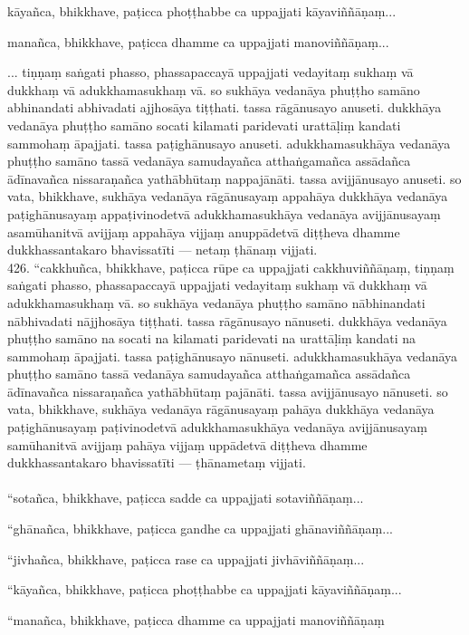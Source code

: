 \documentclass[11pt]{article}
\begin{document}
kāyañca, bhikkhave, paṭicca phoṭṭhabbe ca uppajjati kāyaviññāṇaṃ...\

manañca, bhikkhave, paṭicca dhamme ca uppajjati manoviññāṇaṃ...\

... tiṇṇaṃ saṅgati phasso, phassapaccayā uppajjati vedayitaṃ sukhaṃ vā dukkhaṃ vā adukkhamasukhaṃ vā. so sukhāya vedanāya phuṭṭho samāno abhinandati abhivadati ajjhosāya tiṭṭhati. tassa rāgānusayo anuseti. dukkhāya vedanāya phuṭṭho samāno socati kilamati paridevati urattāḷiṃ kandati sammohaṃ āpajjati. tassa paṭighānusayo anuseti. adukkhamasukhāya vedanāya phuṭṭho samāno tassā vedanāya samudayañca atthaṅgamañca assādañca ādīnavañca nissaraṇañca yathābhūtaṃ nappajānāti. tassa avijjānusayo anuseti. so vata, bhikkhave, sukhāya vedanāya rāgānusayaṃ appahāya dukkhāya vedanāya paṭighānusayaṃ appaṭivinodetvā adukkhamasukhāya vedanāya avijjānusayaṃ asamūhanitvā avijjaṃ appahāya vijjaṃ anuppādetvā diṭṭheva dhamme dukkhassantakaro bhavissatīti — netaṃ ṭhānaṃ vijjati.\\

426. “cakkhuñca, bhikkhave, paṭicca rūpe ca uppajjati cakkhuviññāṇaṃ, tiṇṇaṃ saṅgati phasso, phassapaccayā uppajjati vedayitaṃ sukhaṃ vā dukkhaṃ vā adukkhamasukhaṃ vā. so sukhāya vedanāya phuṭṭho samāno nābhinandati nābhivadati nājjhosāya tiṭṭhati. tassa rāgānusayo nānuseti. dukkhāya vedanāya phuṭṭho samāno na socati na kilamati paridevati na urattāḷiṃ kandati na sammohaṃ āpajjati. tassa paṭighānusayo nānuseti. adukkhamasukhāya vedanāya phuṭṭho samāno tassā vedanāya samudayañca atthaṅgamañca assādañca ādīnavañca nissaraṇañca yathābhūtaṃ pajānāti. tassa avijjānusayo nānuseti. so vata, bhikkhave, sukhāya vedanāya rāgānusayaṃ pahāya dukkhāya vedanāya paṭighānusayaṃ paṭivinodetvā adukkhamasukhāya vedanāya avijjānusayaṃ samūhanitvā avijjaṃ pahāya vijjaṃ uppādetvā diṭṭheva dhamme dukkhassantakaro bhavissatīti — ṭhānametaṃ vijjati.\\
\pagebreak\\


“sotañca, bhikkhave, paṭicca sadde ca uppajjati sotaviññāṇaṃ...\

“ghānañca, bhikkhave, paṭicca gandhe ca uppajjati ghānaviññāṇaṃ...\

“jivhañca, bhikkhave, paṭicca rase ca uppajjati jivhāviññāṇaṃ...\

“kāyañca, bhikkhave, paṭicca phoṭṭhabbe ca uppajjati kāyaviññāṇaṃ...\

“manañca, bhikkhave, paṭicca dhamme ca uppajjati manoviññāṇaṃ\
\end{document}
